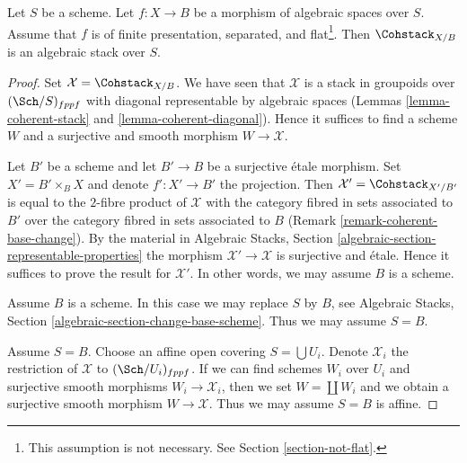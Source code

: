 %
\begin{theorem}
\label{theorem-coherent-algebraic}
Let $S$ be a scheme. Let $f : X \to B$ be a morphism of algebraic spaces
over $S$. Assume that $f$ is of finite presentation, separated, and
flat\footnote{This assumption is not necessary. See
Section \ref{section-not-flat}.}. Then $\Cohstack_{X/B}$ is
an algebraic stack over $S$.
\end{theorem}

\begin{proof}
Set $\mathcal{X} = \Cohstack_{X/B}$. We have seen that $\mathcal{X}$
is a stack in groupoids over $(\Sch/S)_{fppf}$ with diagonal representable
by algebraic spaces
(Lemmas \ref{lemma-coherent-stack} and \ref{lemma-coherent-diagonal}).
Hence it suffices to find a scheme $W$ and a surjective and smooth
morphism $W \to \mathcal{X}$.

\medskip\noindent
Let $B'$ be a scheme and let $B' \to B$ be a surjective \'etale morphism.
Set $X' = B' \times_B X$ and denote $f' : X' \to B'$ the projection.
Then $\mathcal{X}' = \Cohstack_{X'/B'}$ is equal to the $2$-fibre
product of $\mathcal{X}$ with the category fibred in sets
associated to $B'$ over the category fibred in sets associated to $B$
(Remark \ref{remark-coherent-base-change}). By the material in
Algebraic Stacks, Section \ref{algebraic-section-representable-properties}
the morphism $\mathcal{X}' \to \mathcal{X}$ is surjective and \'etale.
Hence it suffices to prove the result for $\mathcal{X}'$.
In other words, we may assume $B$ is a scheme.

\medskip\noindent
Assume $B$ is a scheme. In this case we may replace $S$ by $B$, see
Algebraic Stacks, Section \ref{algebraic-section-change-base-scheme}.
Thus we may assume $S = B$.

\medskip\noindent
Assume $S = B$. Choose an affine open covering $S = \bigcup U_i$.
Denote $\mathcal{X}_i$ the restriction of $\mathcal{X}$ to
$(\Sch/U_i)_{fppf}$. If we can find schemes $W_i$ over $U_i$ and
surjective smooth morphisms $W_i \to \mathcal{X}_i$, then we
set $W = \coprod W_i$ and we obtain a surjective smooth morphism
$W \to \mathcal{X}$. Thus we may assume $S = B$ is affine.


\end{proof}
